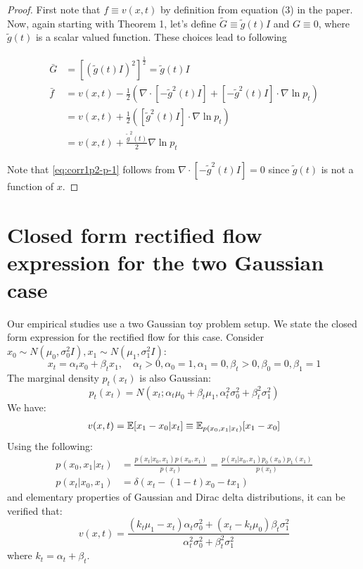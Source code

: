 \corollarytwo*
\begin{proof}
First note that $f \equiv v(x, t)$ by definition from equation (3) in the paper. Now, again starting with Theorem 1, let's define $\tilde G \equiv \tilde g(t)I$ and $G \equiv 0$, where $\tilde g(t)$ is a scalar valued function. These choices lead to following

\begin{align}
\bar G &= [(\tilde g(t)I)^2]^{\frac{1}{2}} = \tilde g(t)I \\
\bar f &= v(x, t) - \frac{1}{2}\left(\nabla \cdot [-\tilde g^2(t)I] + [-\tilde g^2(t)I]\cdot\nabla\ln p_t \right)\\
&= v(x, t) + \frac{1}{2}\left([\tilde g^2(t)I]\cdot\nabla\ln p_t \right) \label{eq:corr1p2-p-1} \\
&= v(x, t) + \frac{\tilde g^2(t)}{2}\nabla\ln p_t
\end{align}

Note that \cref{eq:corr1p2-p-1} follows from $\nabla \cdot [-\tilde g^2(t)I] = 0$ since $\tilde g(t)$ is not a function of $x$.
\end{proof}

\section{Closed form rectified flow expression for the two Gaussian case}
\label{sec:closed_gaussian_app}

Our empirical studies use a two Gaussian toy problem setup.
We state the closed form expression for the rectified flow for this case.
Consider $x_0 \sim N(\mu_0, \sigma^2_0 I), x_1 \sim N(\mu_1, \sigma^2_1 I)$:
\begin{equation}
x_t = \alpha_t x_0 + \beta_t x_1, \quad \alpha_t > 0, \alpha_0=1, \alpha_1=0, \beta_t > 0, \beta_0=0, \beta_1=1
\end{equation}
The marginal density $p_t(x_t)$ is also Gaussian:
\begin{equation}
p_t(x_t)=  N(x_t; \alpha_t \mu_0 + \beta_t \mu_1, \alpha_t^2\sigma_0^2 + \beta_t^2\sigma_1^2)
\end{equation}
We have:
\begin{align}
v(x, t) = \mathbb{E} [x_1 - x_0 | x_t] \equiv \mathbb E_{p(x_0, x_1 | x_t)} [x_1 - x_0]
\end{align}
Using the following:
\begin{align}
p(x_0, x_1 | x_t) &= \frac{p(x_t| x_0, x_1)p(x_0,x_1)}{p(x_t)} = \frac{p(x_t| x_0, x_1)p_0(x_0)p_1(x_1)}{p(x_t)} \\
p(x_t| x_0, x_1) &= \delta(x_t - (1-t)x_0 - tx_1)
\end{align}
and elementary properties of Gaussian and Dirac delta distributions, it can be verified that:
\begin{equation}
\label{eq:closed_form_gaussian}
v(x, t) = \frac{(k_t\mu_1-x_t)\alpha_t\sigma_0^2 + (x_t-k_t\mu_0)\beta_t\sigma_1^2}{\alpha_t^{2}\sigma_0^2 + \beta_t^{2}\sigma_1^2} 
\end{equation}
where $k_t=\alpha_t + \beta_t$. 


